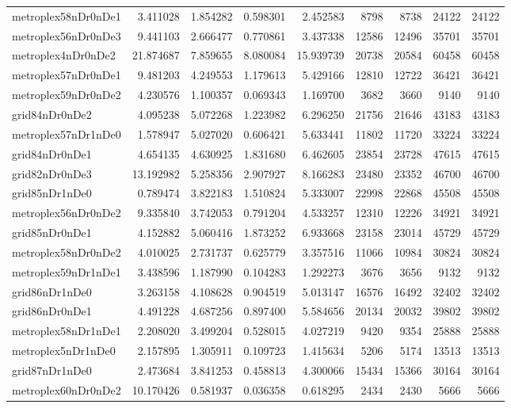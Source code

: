 \begin{longtable}{|l|r|r|r|r|r|r|r|r|}
metroplex58nDr0nDe1 & 3.411028 & 1.854282 & 0.598301 & 2.452583 & 8798 & 8738 & 24122 & 24122 \\
metroplex56nDr0nDe3 & 9.441103 & 2.666477 & 0.770861 & 3.437338 & 12586 & 12496 & 35701 & 35701 \\
metroplex4nDr0nDe2 & 21.874687 & 7.859655 & 8.080084 & 15.939739 & 20738 & 20584 & 60458 & 60458 \\
metroplex57nDr0nDe1 & 9.481203 & 4.249553 & 1.179613 & 5.429166 & 12810 & 12722 & 36421 & 36421 \\
metroplex59nDr0nDe2 & 4.230576 & 1.100357 & 0.069343 & 1.169700 & 3682 & 3660 & 9140 & 9140 \\
grid84nDr0nDe2 & 4.095238 & 5.072268 & 1.223982 & 6.296250 & 21756 & 21646 & 43183 & 43183 \\
metroplex57nDr1nDe0 & 1.578947 & 5.027020 & 0.606421 & 5.633441 & 11802 & 11720 & 33224 & 33224 \\
grid84nDr0nDe1 & 4.654135 & 4.630925 & 1.831680 & 6.462605 & 23854 & 23728 & 47615 & 47615 \\
grid82nDr0nDe3 & 13.192982 & 5.258356 & 2.907927 & 8.166283 & 23480 & 23352 & 46700 & 46700 \\
grid85nDr1nDe0 & 0.789474 & 3.822183 & 1.510824 & 5.333007 & 22998 & 22868 & 45508 & 45508 \\
metroplex56nDr0nDe2 & 9.335840 & 3.742053 & 0.791204 & 4.533257 & 12310 & 12226 & 34921 & 34921 \\
grid85nDr0nDe1 & 4.152882 & 5.060416 & 1.873252 & 6.933668 & 23158 & 23014 & 45729 & 45729 \\
metroplex58nDr0nDe2 & 4.010025 & 2.731737 & 0.625779 & 3.357516 & 11066 & 10984 & 30824 & 30824 \\
metroplex59nDr1nDe1 & 3.438596 & 1.187990 & 0.104283 & 1.292273 & 3676 & 3656 & 9132 & 9132 \\
grid86nDr1nDe0 & 3.263158 & 4.108628 & 0.904519 & 5.013147 & 16576 & 16492 & 32402 & 32402 \\
grid86nDr0nDe1 & 4.491228 & 4.687256 & 0.897400 & 5.584656 & 20134 & 20032 & 39802 & 39802 \\
metroplex58nDr1nDe1 & 2.208020 & 3.499204 & 0.528015 & 4.027219 & 9420 & 9354 & 25888 & 25888 \\
metroplex5nDr1nDe0 & 2.157895 & 1.305911 & 0.109723 & 1.415634 & 5206 & 5174 & 13513 & 13513 \\
grid87nDr1nDe0 & 2.473684 & 3.841253 & 0.458813 & 4.300066 & 15434 & 15366 & 30164 & 30164 \\
metroplex60nDr0nDe2 & 10.170426 & 0.581937 & 0.036358 & 0.618295 & 2434 & 2430 & 5666 & 5666 \\

\end{longtable}
